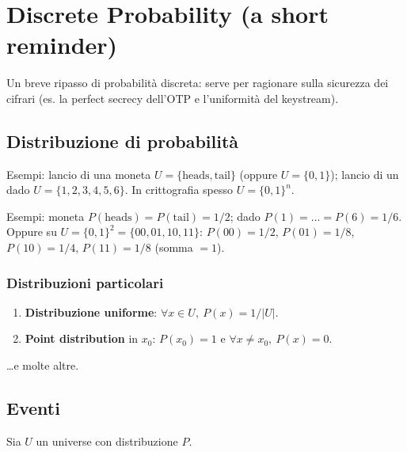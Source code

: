 % 
\chapter{Discrete Probability (a short reminder)}

Un breve ripasso di probabilità discreta: serve per ragionare sulla sicurezza dei cifrari (es. la perfect secrecy dell'OTP e l'uniformità del keystream).

\section{Distribuzione di probabilità}

Esempi: lancio di una moneta $U = \{\text{heads}, \text{tail}\}$ (oppure $U = \{0,1\}$); lancio di un dado $U = \{1,2,3,4,5,6\}$. In crittografia spesso $U = \{0,1\}^n$.

Esempi: moneta $P(\text{heads}) = P(\text{tail}) = 1/2$; dado $P(1) = \dots = P(6) = 1/6$. Oppure su $U = \{0,1\}^2 = \{00,01,10,11\}$: $P(00) = 1/2$, $P(01) = 1/8$, $P(10) = 1/4$, $P(11) = 1/8$ (somma $= 1$).

\subsection{Distribuzioni particolari}
\begin{enumerate}
  \item \textbf{Distribuzione uniforme}: $\forall x \in U,\ P(x) = 1/|U|$.
  \item \textbf{Point distribution} in $x_0$: $P(x_0) = 1$ e $\forall x \neq x_0,\ P(x) = 0$.
\end{enumerate}
\dots e molte altre.

\section{Eventi}

Sia $U$ un universe con distribuzione $P$.


